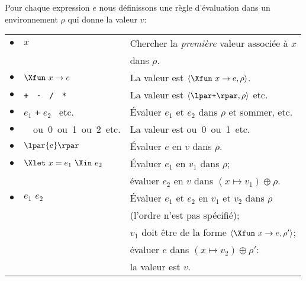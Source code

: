 Pour chaque expression $e$ nous définissons une règle d'évaluation
dans un environnement $\rho$ qui donne la valeur $v$:

\begin{tabular}{rll}
    $\bullet$
  & $x$ 
  & Chercher la \emph{première} valeur associée à $x$\\
 && dans $\rho$.\\
    $\bullet$
  & $\Xfun \,\, x \rightarrow e$
  & La valeur est $\langle\Xfun \,\, x \rightarrow e, \rho\rangle$.\\
    $\bullet$
  & \texttt{+} \ \texttt{-} \ \texttt{/} \ \texttt{*}
  & La valeur est $\langle\lpar\texttt{+}\rpar, \rho\rangle$ etc.\\
    $\bullet$
  & $e_1$ \texttt{+} $e_2$ \ etc.
  & Évaluer $e_1$ et $e_2$ dans $\rho$ et sommer, etc.\\
    $\bullet$
  & \unit \ ou \textsf{0} ou \textsf{1} ou \textsf{2} etc.
  & La valeur est \unit ou \textsf{0} ou \textsf{1} etc.\\
    $\bullet$
  & $\lpar{e}\rpar$
  & Évaluer $e$ en $v$ dans $\rho$.\\
    $\bullet$
  & $\Xlet \,\, x = e_1 \,\, \Xin \,\, e_2$
  & Évaluer $e_1$ en $v_1$ dans $\rho$;\\
  & 
  & évaluer $e_2$ en $v$ dans $(x \mapsto v_1) \oplus \rho$.\\
    $\bullet$
  & $e_1 \,\, e_2$
  & Évaluer $e_1$ et $e_2$ en $v_1$ et $v_2$ dans $\rho$\\
  &
  & (l'ordre n'est pas spécifié);\\
  &
  & $v_1$ doit être de la forme $\langle\Xfun \,\, x \rightarrow
    e,\rho'\rangle$;\\
  &
  & évaluer $e$ dans $(x \mapsto v_2) \oplus \rho'$:\\
  & & la valeur est $v$.
\end{tabular}


